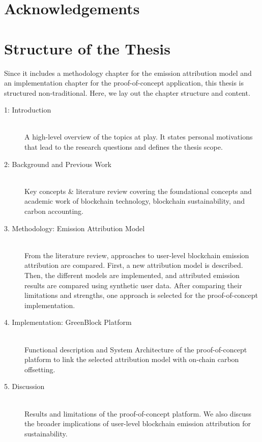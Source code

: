 \documentclass[11pt]{report}
\begin{document}
\newpage
\section*{Acknowledgements}
\tableofcontents



\newpage

\section*{Structure of the Thesis}

Since it includes a methodology chapter for the emission attribution model and an implementation chapter for the proof-of-concept application, this thesis is structured non-traditional. Here, we lay out the chapter structure and content.
\begin{description}
    \item [1: Introduction] \hfill \\
          A high-level overview of the topics at play. It states personal motivations that lead to the research questions and defines the thesis scope.
    \item [2: Background and Previous Work] \hfill \\
          Key concepts \& literature review covering the foundational concepts and academic work of blockchain technology, blockchain sustainability, and carbon accounting.
    \item [3. Methodology: Emission Attribution Model] \hfill \\
          From the literature review, approaches to user-level blockchain emission attribution are compared. First, a new attribution model is described. Then, the different models are implemented, and attributed emission results are compared using synthetic user data. After comparing their limitations and strengths, one approach is selected for the proof-of-concept implementation.
    \item [4. Implementation: GreenBlock Platform] \hfill \\
          Functional description and System Architecture of the proof-of-concept platform to link the selected attribution model with on-chain carbon offsetting.
    \item [5. Discussion] \hfill \\
          Results and limitations of the proof-of-concept platform. We also discuss the broader implications of user-level blockchain emission attribution for sustainability.

\end{description}
\end{document}
